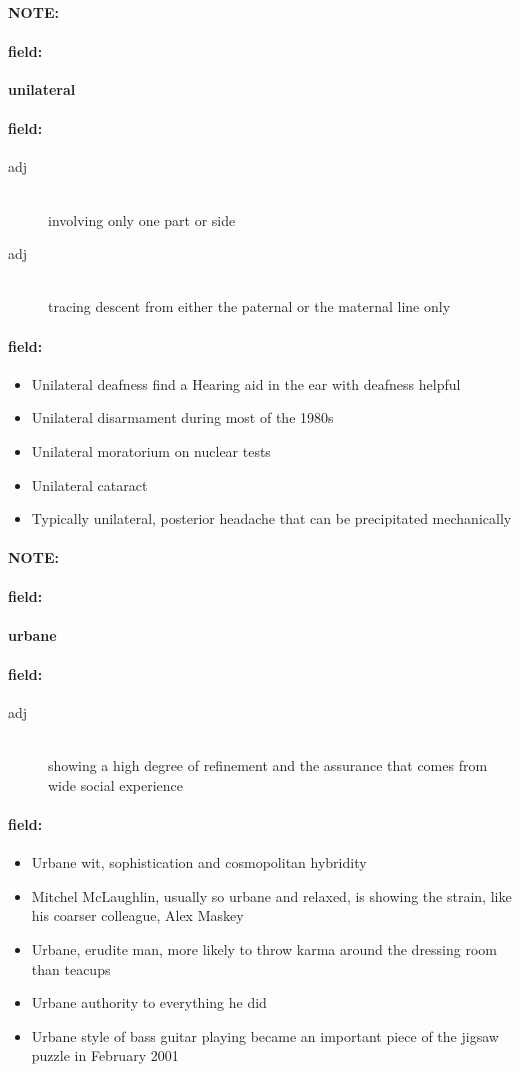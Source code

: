\documentclass[12pt]{article}
\newenvironment{note}{\paragraph{NOTE:}}{}
\newenvironment{field}{\paragraph{field:}}{}
\begin{document}
\begin{note}
\begin{field}
\textbf{\large unilateral}
\end{field}


\begin{field}
\begin{description}
\item[adj] \hfill \\ 
involving only one part or side

\item[adj] \hfill \\ 
tracing descent from either the paternal or the maternal line only

\end{description}
\end{field}

\begin{field}
\begin{itemize}
\item Unilateral deafness find a Hearing aid in the ear with deafness helpful
\item Unilateral disarmament during most of the 1980s
\item Unilateral moratorium on nuclear tests
\item Unilateral cataract
\item Typically unilateral, posterior headache that can be precipitated mechanically
\end{itemize}
\end{field}
\end{note}
\begin{note}
\begin{field}
\textbf{\large urbane}
\end{field}


\begin{field}
\begin{description}
\item[adj] \hfill \\ 
showing a high degree of refinement and the assurance that comes from wide social experience

\end{description}
\end{field}

\begin{field}
\begin{itemize}
\item Urbane wit, sophistication and cosmopolitan hybridity
\item Mitchel McLaughlin, usually so urbane and relaxed, is showing the strain, like his coarser colleague, Alex Maskey
\item Urbane, erudite man, more likely to throw karma around the dressing room than teacups
\item Urbane authority to everything he did
\item Urbane style of bass guitar playing became an important piece of the jigsaw puzzle in February 2001
\end{itemize}
\end{field}
\end{note}
\end{document}
